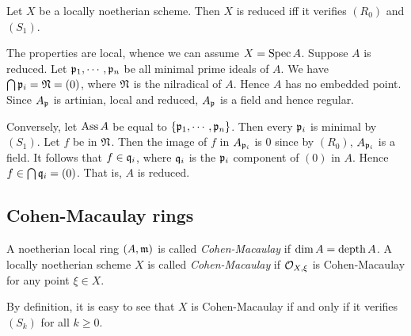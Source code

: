     \begin{example}\label{eg: R-S criterion of reducedness}
        Let $X$ be a locally noetherian scheme.
        Then $X$ is reduced iff it verifies $(R_0)$ and $(S_1)$.

        The properties are local, whence we can assume $X=\operatorname{Spec} A$.
        Suppose $A$ is reduced.
        Let ${\mathfrak{p}}_1,\cdots,{\mathfrak{p}}_n$ be all minimal prime ideals of $A$.
        We have $\bigcap {\mathfrak{p}}_i = {\mathfrak{N}} = (0)$, where ${\mathfrak{N}}$ is the nilradical of $A$.
        Hence $A$ has no embedded point.
        Since $A_{\mathfrak{p}}$ is artinian, local and reduced, $A_{\mathfrak{p}}$ is a field and hence regular.
        
        Conversely, let $\operatorname{Ass} A$ be equal to $\{{\mathfrak{p}}_1,\cdots,{\mathfrak{p}}_n\}$.
        Then every ${\mathfrak{p}}_i$ is minimal by $(S_1)$.
        Let $f$ be in ${\mathfrak{N}}$.
        Then the image of $f$ in $A_{{\mathfrak{p}}_i}$ is $0$ since by $(R_0)$, $A_{{\mathfrak{p}}_i}$ is a field.
        It follows that $f \in {\mathfrak{q}}_i$, where ${\mathfrak{q}}_i$ is the ${\mathfrak{p}}_i$ component of $(0)$ in $A$.
        Hence $f \in \bigcap {\mathfrak{q}}_i = (0)$.
        That is, $A$ is reduced.
    \end{example}


\subsection{Cohen-Macaulay rings}

    \begin{definition}\label{def: Cohen-Macaulay}
        A noetherian local ring $(A,{\mathfrak{m}})$ is called \textit{Cohen-Macaulay} if $\dim A = \operatorname{depth} A$.
        A locally noetherian scheme $X$ is called \textit{Cohen-Macaulay} if ${\mathcal{O}}_{X,\xi}$ is Cohen-Macaulay for any point $\xi \in X$.
    \end{definition}

    By definition, it is easy to see that $X$ is Cohen-Macaulay if and only if it verifies $(S_k)$ for all $k \geq 0$.

    \begin{example}

    \end{example}

